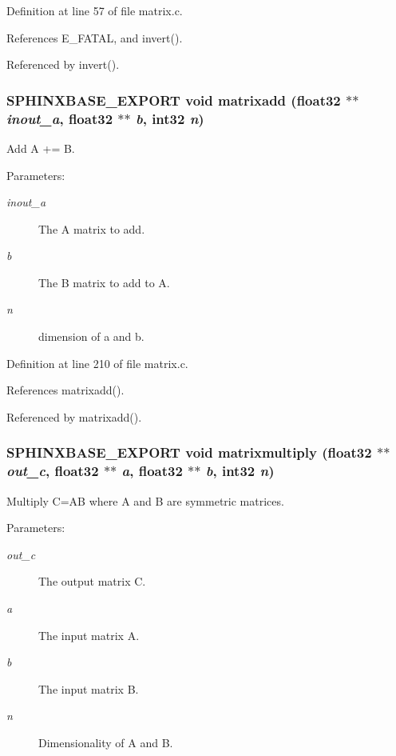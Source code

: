 Definition at line 57 of file matrix.c.

References E\_\-FATAL, and invert().

Referenced by invert().
\subsubsection[{matrixadd}]{\setlength{\rightskip}{0pt plus 5cm}SPHINXBASE\_\-EXPORT void matrixadd (float32 $\ast$$\ast$ {\em inout\_\-a}, \/  float32 $\ast$$\ast$ {\em b}, \/  int32 {\em n})}\label{matrix_8h_545d251a51cc473bad38a83b2a05f61c}


Add A += B. 

\begin{Desc}
\item[Parameters:]
\begin{description}
\item[{\em inout\_\-a}]The A matrix to add. \item[{\em b}]The B matrix to add to A. \item[{\em n}]dimension of a and b. \end{description}
\end{Desc}


Definition at line 210 of file matrix.c.

References matrixadd().

Referenced by matrixadd().
\subsubsection[{matrixmultiply}]{\setlength{\rightskip}{0pt plus 5cm}SPHINXBASE\_\-EXPORT void matrixmultiply (float32 $\ast$$\ast$ {\em out\_\-c}, \/  float32 $\ast$$\ast$ {\em a}, \/  float32 $\ast$$\ast$ {\em b}, \/  int32 {\em n})}\label{matrix_8h_caaf5d2c02d9d12f10abc462ac65cde9}


Multiply C=AB where A and B are symmetric matrices. 

\begin{Desc}
\item[Parameters:]
\begin{description}
\item[{\em out\_\-c}]The output matrix C. \item[{\em a}]The input matrix A. \item[{\em b}]The input matrix B. \item[{\em n}]Dimensionality of A and B. \end{description}
\end{Desc}


